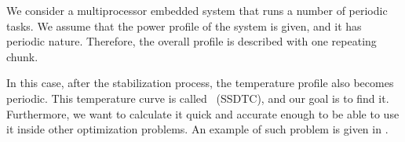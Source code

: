We consider a multiprocessor embedded system that runs a number of periodic tasks. We assume that the power profile of the system is given, and it has periodic nature. Therefore, the overall profile is described with one repeating chunk.

In this case, after the stabilization process, the temperature profile also becomes periodic. This temperature curve is called \ssdtc\ (SSDTC), and our goal is to find it. Furthermore, we want to calculate it quick and accurate enough to be able to use it inside other optimization problems. An example of such problem is given in .
